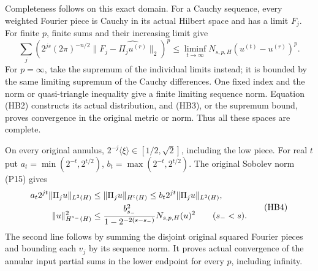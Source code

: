 \documentclass[
  11pt,
]{article}
\begin{document}
Completeness follows on this exact domain. For a Cauchy sequence, every
weighted Fourier piece is Cauchy in its actual Hilbert space and has a
limit \(F_j\). For finite \(p\), finite sums and their increasing limit
give \[
\sum_j\left(2^{js}(2\pi)^{-n/2}
 \|F_j-\widehat{\Pi_ju^{(r)}}\|_2\right)^p
\le\liminf_{t\to\infty}N_{s,p,H}(u^{(t)}-u^{(r)})^p.
\tag{HB3}
\] For \(p=\infty\), take the supremum of the individual limits instead;
it is bounded by the same limiting supremum of the Cauchy differences.
One fixed index and the norm or quasi-triangle inequality give a finite
limiting sequence norm. Equation (HB2) constructs its actual
distribution, and (HB3), or the supremum bound, proves convergence in
the original metric or norm. Thus all these spaces are complete.

On every original annulus, \(2^{-j}\langle\xi\rangle\in[1/2,\sqrt2]\),
including the low piece. For real \(t\) put
\(a_t=\min(2^{-t},2^{t/2})\), \(b_t=\max(2^{-t},2^{t/2})\). The original
Sobolev norm (P15) gives \[
\begin{aligned}
a_t2^{jt}\|\Pi_ju\|_{L^2(H)}&\le\|\Pi_ju\|_{H^t(H)}
 \le b_t2^{jt}\|\Pi_ju\|_{L^2(H)},\\
\|u\|_{H^{s_-}(H)}^2&\le
 {b_{s_-}^2\over1-2^{-2(s-s_-)}}N_{s,p,H}(u)^2
 \qquad(s_-<s).
\end{aligned}
\tag{HB4}
\] The second line follows by summing the disjoint original squared
Fourier pieces and bounding each \(v_j\) by its sequence norm. It proves
actual convergence of the annular input partial sums in the lower
endpoint for every \(p\), including infinity.
\end{document}
